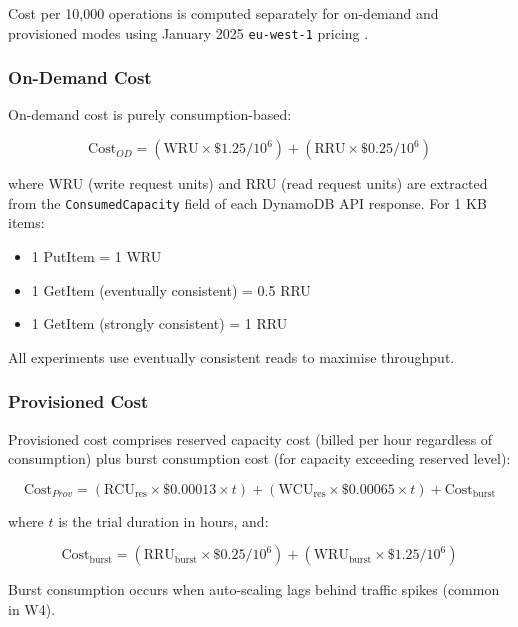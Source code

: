 Cost per 10,000 operations is computed separately for on-demand and provisioned modes using January 2025 \texttt{eu-west-1} pricing \citep{aws2025capacitymode}.

\subsubsection{On-Demand Cost}

On-demand cost is purely consumption-based:

\begin{equation}
\text{Cost}_{OD} = (\text{WRU} \times \$1.25 / 10^6) + (\text{RRU} \times \$0.25 / 10^6)
\end{equation}

where WRU (write request units) and RRU (read request units) are extracted from the \texttt{ConsumedCapacity} field of each DynamoDB API response. For 1 KB items:
\begin{itemize}
    \item 1 PutItem = 1 WRU
    \item 1 GetItem (eventually consistent) = 0.5 RRU
    \item 1 GetItem (strongly consistent) = 1 RRU
\end{itemize}

All experiments use eventually consistent reads to maximise throughput.

\subsubsection{Provisioned Cost}

Provisioned cost comprises reserved capacity cost (billed per hour regardless of consumption) plus burst consumption cost (for capacity exceeding reserved level):

\begin{equation}
\text{Cost}_{Prov} = (\text{RCU}_{\text{res}} \times \$0.00013 \times t) + (\text{WCU}_{\text{res}} \times \$0.00065 \times t) + \text{Cost}_{\text{burst}}
\end{equation}

where $t$ is the trial duration in hours, and:

\begin{equation}
\text{Cost}_{\text{burst}} = (\text{RRU}_{\text{burst}} \times \$0.25 / 10^6) + (\text{WRU}_{\text{burst}} \times \$1.25 / 10^6)
\end{equation}

Burst consumption occurs when auto-scaling lags behind traffic spikes (common in W4).

